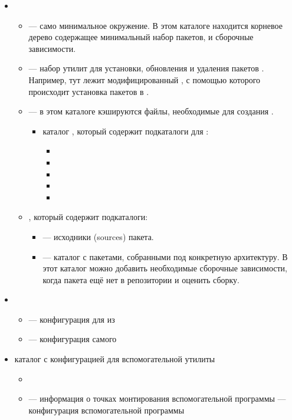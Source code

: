\begin{itemize}
	\item {}
	\begin{itemize}
		\item {} --- само минимальное окружение. В этом каталоге находится 
			корневое дерево содержащее минимальный набор пакетов,  
			и сборочные зависимости.
		\item {} --- набор утилит для установки, обновления и удаления 
			пакетов . Например, тут лежит модифицированный , 
			с помощью которого происходит установка пакетов в .
		\item {} --- в этом каталоге кэшируются файлы, необходимые для 
			создания .
		\begin{itemize}
			\item каталог , который содержит 
				подкаталоги для :
			\begin{itemize}
				\item {}
				\item {}
				\item {}
				\item {}
				\item {}
			\end{itemize} 
		\end{itemize}
		\item {}, который содержит подкаталоги:
		\begin{itemize}
			\item {} --- исходники (sources) пакета.
			\item {} --- каталог с пакетами, собранными 
				под конкретную архитектуру.
			В этот каталог можно добавить необходимые сборочные зависимости, когда 
				пакета ещё нет в репозитории и оценить сборку.
		\end{itemize}
	\end{itemize}
	\item {}
	\begin{itemize}
		\item {} --- конфигурация для  из 
		\item {} --- конфигурация самого 
	\end{itemize}
	\item {} каталог с конфигурацией для вспомогательной утилиты 
	\begin{itemize}
		\item {}
		\item {} --- информация о точках монтирования вспомогательной программы 
		 --- конфигурация вспомогательной программы 
	\end{itemize} 
\end{itemize}


